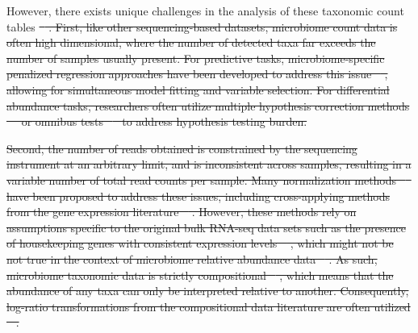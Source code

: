 \documentclass[10pt,letterpaper]{article}
\providecommand{\DIFdeltex}[1]{{\protect\color{red}\sout{#1}}}                      %
\providecommand{\DIFdelbegin}{} %
\providecommand{\DIFdel}[1]{\texorpdfstring{\DIFdeltex{#1}}{}} %
\newcommand{\DIFscaledelfig}{0.5}
\newlength{\DIFdelgraphicswidth} %
\newlength{\DIFdelgraphicsheight} %
\newcommand{\DIFdelincludegraphics}[2][]{%
\sbox{\DIFdelgraphicsbox}{\DIFOincludegraphics[#1]{#2}}%
\settoboxwidth{\DIFdelgraphicswidth}{\DIFdelgraphicsbox} %
\settoboxtotalheight{\DIFdelgraphicsheight}{\DIFdelgraphicsbox} %
\scalebox{\DIFscaledelfig}{%
\parbox[b]{\DIFdelgraphicswidth}{\usebox{\DIFdelgraphicsbox}\\[-\baselineskip] \rule{\DIFdelgraphicswidth}{0em}}\llap{\resizebox{\DIFdelgraphicswidth}{\DIFdelgraphicsheight}{%
\setlength{\unitlength}{\DIFdelgraphicswidth}%
\begin{picture}(1,1)%
\thicklines\linethickness{2pt} %
{\color[rgb]{1,0,0}\put(0,0){\framebox(1,1){}}}%
{\color[rgb]{1,0,0}\put(0,0){\line( 1,1){1}}}%
{\color[rgb]{1,0,0}\put(0,1){\line(1,-1){1}}}%
\end{picture}%
}\hspace*{3pt}}} %
} %
\DeclareRobustCommand{\DIFdelbegin}{\DIFOdelbegin \let\includegraphics\DIFdelincludegraphics} %
\begin{document}
However, there exists unique challenges in the analysis of these taxonomic count tables \DIFdelbegin \DIFdel{\mbox{%
\cite{li2019,li2015}}\hspace{0pt}%
. First, like other sequencing-based datasets, microbiome count data is often high dimensional, where the number of detected taxa far exceeds the number of samples usually present. For predictive tasks, microbiome-specific penalized regression approaches have been developed to address this issue \mbox{%
\cite{shi2016}}\hspace{0pt}%
, allowing for simultaneous model fitting and variable selection. For differential abundance tasks, researchers often utilize multiple hypothesis correction methods \mbox{%
\cite{sankaran2014,benjamini1995} }\hspace{0pt}%
or omnibus tests \mbox{%
\cite{chen2018} }\hspace{0pt}%
to address hypothesis testing burden. 
}%

\DIFdel{Second, the number of reads obtained is constrained by the sequencing instrument at an arbitrary limit, and is inconsistent across samples, resulting in a variable number of total read counts per sample. Many normalization methods \mbox{%
\cite{weiss2017} }\hspace{0pt}%
have been proposed to address these issues, including cross-applying methods from the gene expression literature \mbox{%
\cite{mcmurdie2014}}\hspace{0pt}%
. However, these methods rely on assumptions specific to the original bulk RNA-seq data sets such as the presence of housekeeping genes with consistent expression levels \mbox{%
\cite{love2014}}\hspace{0pt}%
, which might not be not true in the context of microbiome relative abundance data \mbox{%
\cite{quinn2019,quinn2018b}}\hspace{0pt}%
. As such, microbiome taxonomic data is strictly compositional \mbox{%
\cite{gloor2017}}\hspace{0pt}%
, which means that the abundance of any taxa can only be interpreted relative to another. Consequently, log-ratio transformations from the compositional data literature are often utilized \mbox{%
\cite{aitchison1999}}\hspace{0pt}%
. 
}%
\end{document}
